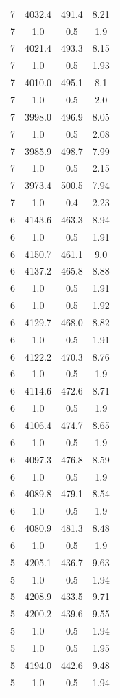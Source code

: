 \begin{table}[htbp]
\begin{tabular}{c c c c}
7 & 4032.4 & 491.4 & 8.21 \\
7 & 1.0 & 0.5 & 1.9 \\
7 & 4021.4 & 493.3 & 8.15 \\
7 & 1.0 & 0.5 & 1.93 \\
7 & 4010.0 & 495.1 & 8.1 \\
7 & 1.0 & 0.5 & 2.0 \\
7 & 3998.0 & 496.9 & 8.05 \\
7 & 1.0 & 0.5 & 2.08 \\
7 & 3985.9 & 498.7 & 7.99 \\
7 & 1.0 & 0.5 & 2.15 \\
7 & 3973.4 & 500.5 & 7.94 \\
7 & 1.0 & 0.4 & 2.23 \\
6 & 4143.6 & 463.3 & 8.94 \\
6 & 1.0 & 0.5 & 1.91 \\
6 & 4150.7 & 461.1 & 9.0 \\
6 & 4137.2 & 465.8 & 8.88 \\
6 & 1.0 & 0.5 & 1.91 \\
6 & 1.0 & 0.5 & 1.92 \\
6 & 4129.7 & 468.0 & 8.82 \\
6 & 1.0 & 0.5 & 1.91 \\
6 & 4122.2 & 470.3 & 8.76 \\
6 & 1.0 & 0.5 & 1.9 \\
6 & 4114.6 & 472.6 & 8.71 \\
6 & 1.0 & 0.5 & 1.9 \\
6 & 4106.4 & 474.7 & 8.65 \\
6 & 1.0 & 0.5 & 1.9 \\
6 & 4097.3 & 476.8 & 8.59 \\
6 & 1.0 & 0.5 & 1.9 \\
6 & 4089.8 & 479.1 & 8.54 \\
6 & 1.0 & 0.5 & 1.9 \\
6 & 4080.9 & 481.3 & 8.48 \\
6 & 1.0 & 0.5 & 1.9 \\
5 & 4205.1 & 436.7 & 9.63 \\
5 & 1.0 & 0.5 & 1.94 \\
5 & 4208.9 & 433.5 & 9.71 \\
5 & 4200.2 & 439.6 & 9.55 \\
5 & 1.0 & 0.5 & 1.94 \\
5 & 1.0 & 0.5 & 1.95 \\
5 & 4194.0 & 442.6 & 9.48 \\
5 & 1.0 & 0.5 & 1.94 \\

\end{tabular}
\end{table}
